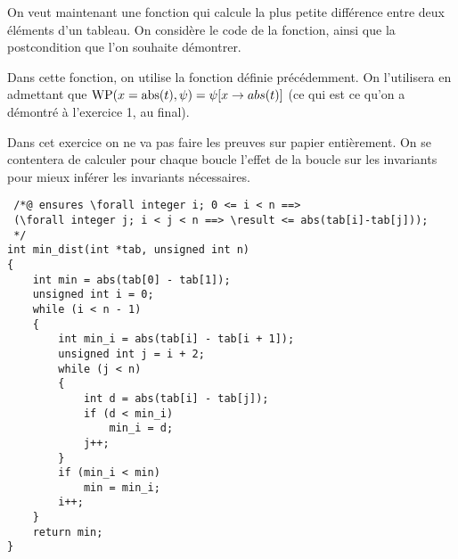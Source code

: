 \documentclass[11pt,answers]{exam}
\begin{document}
\begin{questions}



    On veut maintenant une fonction qui calcule la plus petite différence entre deux éléments d’un tableau. On considère le code de la fonction, ainsi que la postcondition que l’on souhaite démontrer.

    Dans cette fonction, on utilise la fonction  définie précédemment.
    On l’utilisera en admettant que $\WP(x = \code{abs}(t),\psi) = \psi[x \rightarrow abs(t)]$ (ce qui est ce qu’on a démontré à l’exercice 1, au final).

    Dans cet exercice on ne va pas faire les preuves sur papier entièrement. On se contentera de calculer pour chaque boucle l’effet de la boucle sur les invariants pour mieux inférer les invariants nécessaires.

    \begin{lstlisting}
 /*@ ensures \forall integer i; 0 <= i < n ==> 
 (\forall integer j; i < j < n ==> \result <= abs(tab[i]-tab[j]));
 */
int min_dist(int *tab, unsigned int n)
{
    int min = abs(tab[0] - tab[1]);
    unsigned int i = 0;
    while (i < n - 1)
    {
        int min_i = abs(tab[i] - tab[i + 1]);
        unsigned int j = i + 2;
        while (j < n)
        {
            int d = abs(tab[i] - tab[j]);
            if (d < min_i)
                min_i = d;
            j++;
        }
        if (min_i < min)
            min = min_i;
        i++;
    }
    return min;
}
    \end{lstlisting}

    \begin{parts}


\end{parts}
\end{questions}
\end{document}
